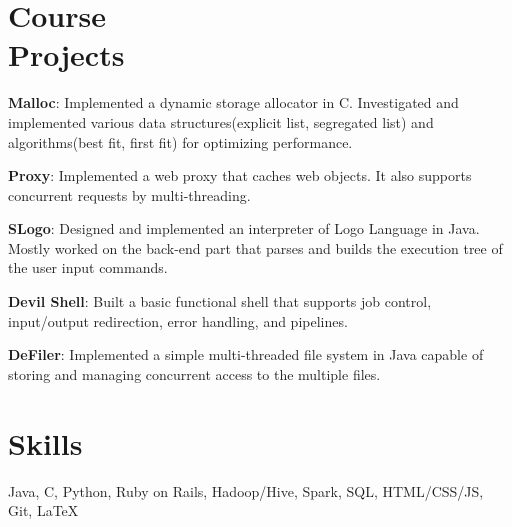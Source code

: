 \documentclass[10pt,margin,line]{resume}
\begin{document}
\begin{resume}
\section{\mysidestyle Course\\Projects}
\begin{list3}
    \item \textbf{Malloc}: Implemented a dynamic storage allocator in C. Investigated and implemented various data structures(explicit list, segregated list) and algorithms(best fit, first fit) for optimizing performance.
    \item \textbf{Proxy}: Implemented a web proxy that caches web objects. It also supports concurrent requests by multi-threading.
	\item \textbf{SLogo}: Designed and implemented an interpreter of Logo Language in Java. Mostly worked on the back-end part that parses and builds the execution tree of the user input commands.
    \item \textbf{Devil Shell}: Built a basic functional shell that supports job control, input/output redirection, error handling, and pipelines.
    \item \textbf{DeFiler}: Implemented a simple multi-threaded file system in Java capable of storing and managing concurrent access to the multiple files.
\end{list3}

\vspace{1mm}%

\section{\mysidestyle Skills}
    Java, C, Python, Ruby on Rails, Hadoop/Hive, Spark, SQL, HTML/CSS/JS, Git, \LaTeX\\

\end{resume}
\end{document}

